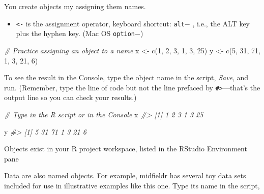 \documentclass[
]{book}
\newenvironment{Shaded}{\begin{snugshade}}{\end{snugshade}}
\newcommand{\CommentTok}[1]{\textcolor[rgb]{0.56,0.35,0.01}{\textit{#1}}}
\newcommand{\DecValTok}[1]{\textcolor[rgb]{0.00,0.00,0.81}{#1}}
\newcommand{\FunctionTok}[1]{\textcolor[rgb]{0.00,0.00,0.00}{#1}}
\newcommand{\NormalTok}[1]{#1}
\newcommand{\OtherTok}[1]{\textcolor[rgb]{0.56,0.35,0.01}{#1}}
\providecommand{\tightlist}{%
  \setlength{\itemsep}{0pt}\setlength{\parskip}{0pt}}
\begin{document}
You create objects my assigning them names.

\begin{itemize}
\tightlist
\item
  \texttt{\textless{}-} is the assignment operator, keyboard shortcut: \texttt{alt}\(-\) , i.e., the ALT key plus the hyphen key. (Mac OS \texttt{option}\(-\))
\end{itemize}

\begin{Shaded}
\begin{Highlighting}[]
\CommentTok{\# Practice assigning an object to a name}
\NormalTok{x }\OtherTok{\textless{}{-}} \FunctionTok{c}\NormalTok{(}\DecValTok{1}\NormalTok{, }\DecValTok{2}\NormalTok{, }\DecValTok{3}\NormalTok{, }\DecValTok{1}\NormalTok{, }\DecValTok{3}\NormalTok{, }\DecValTok{25}\NormalTok{)}
\NormalTok{y }\OtherTok{\textless{}{-}} \FunctionTok{c}\NormalTok{(}\DecValTok{5}\NormalTok{, }\DecValTok{31}\NormalTok{, }\DecValTok{71}\NormalTok{, }\DecValTok{1}\NormalTok{, }\DecValTok{3}\NormalTok{, }\DecValTok{21}\NormalTok{, }\DecValTok{6}\NormalTok{)}
\end{Highlighting}
\end{Shaded}

To see the result in the Console, type the object name in the script, \emph{Save}, and run. (Remember, type the line of code but not the line prefaced by \texttt{\#\textgreater{}}---that's the output line so you can check your results.)

\begin{Shaded}
\begin{Highlighting}[]
\CommentTok{\# Type in the R script or in the Console}
\NormalTok{x}
\CommentTok{\#\textgreater{} [1]  1  2  3  1  3 25}

\NormalTok{y}
\CommentTok{\#\textgreater{} [1]  5 31 71  1  3 21  6}
\end{Highlighting}
\end{Shaded}

Objects exist in your R project workspace, listed in the RStudio Environment pane

Data are also named objects. For example, midfieldr has several toy data sets included for use in illustrative examples like this one. Type its name in the script,
\end{document}
